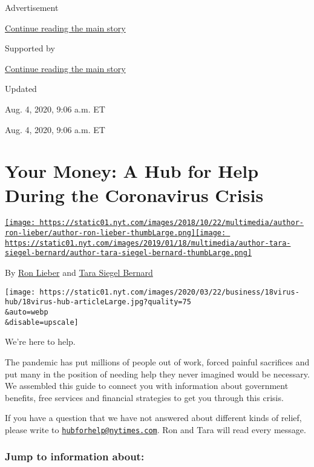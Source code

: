 Advertisement

\protect\hyperlink{after-top}{Continue reading the main story}

Supported by

\protect\hyperlink{after-sponsor}{Continue reading the main story}

Updated~

Aug. 4, 2020, 9:06 a.m. ET

Aug. 4, 2020, 9:06 a.m. ET

\hypertarget{your-money-a-hub-for-help-during-the-coronavirus-crisis}{%
\section{Your Money: A Hub for Help During the Coronavirus
Crisis}\label{your-money-a-hub-for-help-during-the-coronavirus-crisis}}

\href{https://www.nytimes.com/by/ron-lieber}{\texttt{[image: https://static01.nyt.com/images/2018/10/22/multimedia/author-ron-lieber/author-ron-lieber-thumbLarge.png]}}\href{https://www.nytimes.com/by/tara-siegel-bernard}{\texttt{[image: https://static01.nyt.com/images/2019/01/18/multimedia/author-tara-siegel-bernard/author-tara-siegel-bernard-thumbLarge.png]}}

By \href{https://www.nytimes.com/by/ron-lieber}{Ron Lieber} and
\href{https://www.nytimes.com/by/tara-siegel-bernard}{Tara Siegel
Bernard}

\texttt{[image: https://static01.nyt.com/images/2020/03/22/business/18virus-hub/18virus-hub-articleLarge.jpg?quality=75\\\&auto=webp\\\&disable=upscale]}

We're here to help.

The pandemic has put millions of people out of work, forced painful
sacrifices and put many in the position of needing help they never
imagined would be necessary. We assembled this guide to connect you with
information about government benefits, free services and financial
strategies to get you through this crisis.

If you have a question that we have not answered about different kinds
of relief, please write to
\href{mailto:hubforhelp@nytimes.com}{\nolinkurl{hubforhelp@nytimes.com}}.
Ron and Tara will read every message.

\hypertarget{jump-to-information-about}{%
\subsubsection{Jump to information
about:}\label{jump-to-information-about}}

